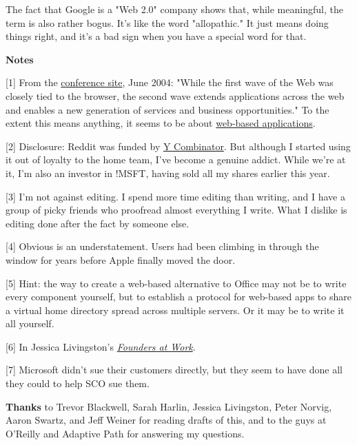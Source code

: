 The fact that Google is a "Web 2.0"
                  company shows that, while meaningful, the term is also rather
                  bogus. It's like the word "allopathic." It just means doing
                  things right, and it's a bad sign when you have a special word
                  for that.




                  \textbf{Notes}

[1] From the
                  \href{http://web.archive.org/web/20040602111547/http://web2con.com/}{conference site}, June 2004: "While the first wave of the Web was closely
                  tied to the browser, the second wave extends applications
                  across the web and enables a new generation of services and
                  business opportunities." To the extent this means anything, it
                  seems to be about
                  \href{http://www.paulgraham.com/road.html}{web-based applications}.

[2] Disclosure: Reddit was funded by
                  \href{http://ycombinator.com}{Y Combinator}. But
                  although I started using it out of loyalty to the home team,
                  I've become a genuine addict. While we're at it, I'm also an
                  investor in !MSFT, having sold all my shares earlier this
                  year.

[3] I'm not against editing. I spend more time editing than
                  writing, and I have a group of picky friends who proofread
                  almost everything I write. What I dislike is editing done
                  after the fact by someone else.

[4] Obvious is an understatement. Users had been climbing in
                  through the window for years before Apple finally moved the
                  door.

[5] Hint: the way to create a web-based alternative to Office
                  may not be to write every component yourself, but to establish
                  a protocol for web-based apps to share a virtual home
                  directory spread across multiple servers. Or it may be to
                  write it all yourself.

[6] In Jessica Livingston's
                  \href{http://foundersatwork.com}{\emph{Founders at Work}}.

[7] Microsoft didn't sue their customers directly, but they
                  seem to have done all they could to help SCO sue them.

\textbf{Thanks}
                  to Trevor Blackwell, Sarah Harlin, Jessica Livingston, Peter
                  Norvig, Aaron Swartz, and Jeff Weiner for reading drafts of
                  this, and to the guys at O'Reilly and Adaptive Path for
                  answering my questions.




              
            
          
